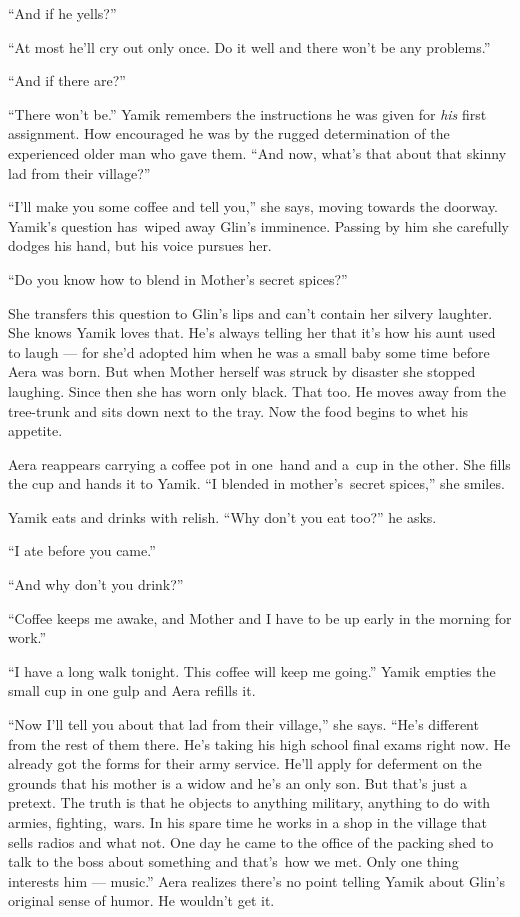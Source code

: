 \documentclass[twoside,11pt]{book}
\begin{document}
{}``And if he yells?''

{}``At most he'll cry out only once. Do it well and there won't be any problems.''

{}``And if there are?''

``There won't be.'' Yamik remembers the instructions he was given for \textit{his} first assignment.
How encouraged he was by the rugged determination of the experienced older man who gave them. ``And now, what's that
about that skinny lad from their village?''

{}``I'll make you some coffee and tell you,{}'' she says, moving towards the doorway. Yamik's question has~wiped away
Glin's {imminence}. Passing by him she carefully dodges his hand, but his voice pursues her.

{}``Do you know how to blend in Mother's secret spices?''

She transfers this question to Glin's lips and can't contain her silvery laughter. She knows Yamik loves that. He's
always telling her that it's how his aunt used to laugh ---  for she'd adopted him when he was a small baby some
time before Aera was born. But when Mother herself was struck by disaster she stopped laughing. Since then she has
worn only black. That too. He moves away from the tree-trunk and sits down next to the tray. Now the food begins to
whet his appetite.

Aera reappears carrying a coffee pot in one~hand and a~cup in the other. She fills the cup and hands it to Yamik. ``I
blended in mother's~secret spices,'' she smiles.

Yamik eats and drinks with relish. ``Why don't you eat too?'' he asks.

{}``I ate before you came.''

{}``And why don't you drink?''

{}``Coffee keeps me awake, and Mother and I have to be up early in the morning for work.''

{}``I have a long walk tonight. This coffee will keep me going.'' Yamik empties the small cup in one gulp and Aera
refills it.

{}``Now I'll tell you about that lad from their village,'' she says. {}``He's different from the rest of them there.
He's taking his high school final exams right now. He already got the forms for their army service. He'll apply for
deferment on the grounds that his mother is a widow and he's an only son. But that's just a pretext. The truth is that
he objects to anything military, anything to do with armies, fighting,~wars. In his spare time he works in a shop in
the village that sells radios and what not. One day he came to the office of the packing shed to talk to the
boss about something and that's~how we met. Only one thing interests him --- music.'' Aera realizes there's no point
telling Yamik about Glin's original{ }sense of humor. He wouldn't get it.
\end{document}
